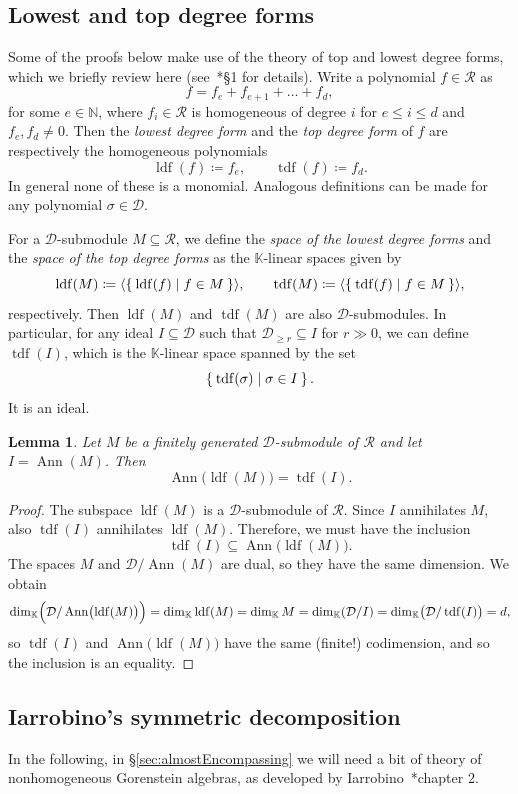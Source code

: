 \documentclass[a4paper,11pt,reqno]{amsart}
\newcommand{\calD}{\mathcal{D}}
\newcommand{\calR}{\mathcal{R}}
\newcommand{\bbK}{\mathbb{K}}
\newcommand{\bbN}{\mathbb{N}}
\DeclareMathOperator{\Ann}{Ann}
\DeclareMathOperator{\ldf}{ldf}
\DeclareMathOperator{\tdf}{tdf}
\numberwithin{equation}{section}
\theoremstyle{definition}
\theoremstyle{plain}
\newtheorem{lem}[defn]{Lemma}
\theoremstyle{remark}
\begin{document}
\subsection{Lowest and top degree forms}
\noindent Some of the proofs below make use of the theory of {top and lowest degree} forms, which we briefly review here (see~\cite{Iar94}*{\S1} for details).
Write a polynomial $f\in\calR$ as \[ f = f_e + f_{e+1}+ \ldots +f_d,\]
for some $e\in\bbN$,
where
$f_i\in \calR$ is homogeneous of degree $i$ for $e\leq i\leq d$ and $f_e, f_d\neq
0$. Then the \emph{lowest degree
form} and the \emph{top degree form} of $f$ are respectively the homogeneous polynomials
\[\ldf(f) \coloneq f_e,\qquad \tdf(f) \coloneq f_d.\]
In general none of these is a monomial. Analogous definitions can be made for any polynomial
$\sigma\in \calD$.

For a $\calD$-submodule $M\subseteq \calR$, we define the
\textit{space of the lowest degree forms} and the \textit{space of the top degree forms} as the $\bbK$-linear spaces given by
\[
\ldf(M)\coloneq\langle\Set{\ldf(f)|f\in M}\rangle,\qquad \tdf(M)\coloneq\langle\Set{\tdf(f)|f\in M}\rangle,
\]
respectively.
Then
$\ldf(M)$ and $\tdf(M)$ are also $\calD$-submodules. In particular,
for any ideal $I\subseteq \calD$ such that $\calD_{\geq r}\subseteq I$ for $r{\gg 0}$, {we can define $\tdf(I)$, which is the $\bbK$-linear space spanned by the set
\[\Set{\tdf(\sigma) |\sigma\in I}.\]
It is an ideal.}

\begin{lem}
\label{lem:ann_ldf(M)=tdf(I)}
Let $M$ be a finitely generated $\calD$-submodule of $\calR$ and let $I=\Ann(M)$.
Then \[\Ann\bigl(\ldf(M)\bigr)=\tdf(I).\]
\end{lem}
\begin{proof}
{The subspace} $\ldf(M)$ is a $\calD$-submodule of $\calR$. Since $I$ annihilates $M$, also {$\tdf(I)$ annihilates} $\ldf(M)$. Therefore, we must have the inclusion \[\tdf(I)\subseteq\Ann\bigl(\ldf(M)\bigr).\]
The spaces $M$ and $\calD/\Ann(M)$ are dual, so they have the same dimension. We
obtain
\[
\dim_{\bbK}\Bigl(\calD/\Ann\bigl(\ldf(M)\bigr)\Bigr)=\dim_{\bbK}\ldf(M)=\dim_{\bbK} M=\dim_{\bbK}(\calD/I)=\dim_{\bbK}\bigl(\calD/\tdf(I)\bigr) =d,
\]
so $\tdf(I)$ and $\Ann\bigl(\ldf(M)\bigr)$ have the same (finite!) {codimension, and
so the inclusion} is an equality.
\end{proof}

\subsection{Iarrobino's symmetric decomposition}
\newcommand{\mm}{\mathfrak{m}}%
\noindent In the following, in \S\ref{sec:almostEncompassing} we will need a bit
of theory of nonhomogeneous Gorenstein algebras, as developed by
Iarrobino~\cite{Iar94}*{chapter 2}.
\end{document}
